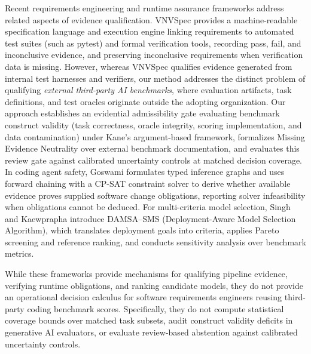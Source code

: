 \documentclass[runningheads]{llncs}
\begin{document}
Recent requirements engineering and runtime assurance frameworks address related aspects of evidence qualification. VNVSpec \cite{arief_vnvspec_2026} provides a machine-readable specification language and execution engine linking requirements to automated test suites (such as pytest) and formal verification tools, recording pass, fail, and inconclusive evidence, and preserving inconclusive requirements when verification data is missing. However, whereas VNVSpec qualifies evidence generated from internal test harnesses and verifiers, our method addresses the distinct problem of qualifying \emph{external third-party AI benchmarks}, where evaluation artifacts, task definitions, and test oracles originate outside the adopting organization. Our approach establishes an evidential admissibility gate evaluating benchmark construct validity (task correctness, oracle integrity, scoring implementation, and data contamination) under Kane's argument-based framework, formalizes Missing Evidence Neutrality over external benchmark documentation, and evaluates this review gate against calibrated uncertainty controls at matched decision coverage. In coding agent safety, Goswami \cite{goswami_assurance_envelopes_2026} formulates typed inference graphs and uses forward chaining with a CP-SAT constraint solver to derive whether available evidence proves supplied software change obligations, reporting solver infeasibility when obligations cannot be deduced. For multi-criteria model selection, Singh and Kaewprapha \cite{singh_damsa_sms_2026} introduce DAMSA--SMS (Deployment-Aware Model Selection Algorithm), which translates deployment goals into criteria, applies Pareto screening and reference ranking, and conducts sensitivity analysis over benchmark metrics. 

While these frameworks provide mechanisms for qualifying pipeline evidence, verifying runtime obligations, and ranking candidate models, they do not provide an operational decision calculus for software requirements engineers reusing third-party coding benchmark scores. Specifically, they do not compute statistical coverage bounds over matched task subsets, audit construct validity deficits in generative AI evaluators, or evaluate review-based abstention against calibrated uncertainty controls.
\end{document}
